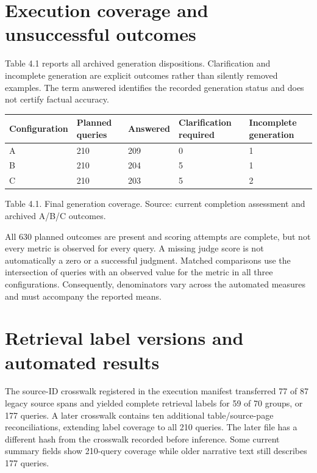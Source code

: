 \section{Execution coverage and unsuccessful outcomes}

Table 4.1 reports all archived generation dispositions. Clarification and incomplete generation are explicit outcomes rather than silently removed examples. The term answered identifies the recorded generation status and does not certify factual accuracy.


{\small\begin{longtable}{@{}p{1.172in}p{1.172in}p{1.172in}p{1.172in}p{1.172in}@{}}\toprule

Configuration & Planned queries & Answered & Clarification required & Incomplete generation \\ \midrule\endhead

A & 210 & 209 & 0 & 1 \\

B & 210 & 204 & 5 & 1 \\

C & 210 & 203 & 5 & 2 \\

\bottomrule\end{longtable}}

Table 4.1. Final generation coverage. Source: current completion assessment and archived A/B/C outcomes.


All 630 planned outcomes are present and scoring attempts are complete, but not every metric is observed for every query. A missing judge score is not automatically a zero or a successful judgment. Matched comparisons use the intersection of queries with an observed value for the metric in all three configurations. Consequently, denominators vary across the automated measures and must accompany the reported means.


\section{Retrieval label versions and automated results}

The source-ID crosswalk registered in the execution manifest transferred 77 of 87 legacy source spans and yielded complete retrieval labels for 59 of 70 groups, or 177 queries. A later crosswalk contains ten additional table/source-page reconciliations, extending label coverage to all 210 queries. The later file has a different hash from the crosswalk recorded before inference. Some current summary fields show 210-query coverage while older narrative text still describes 177 queries.


